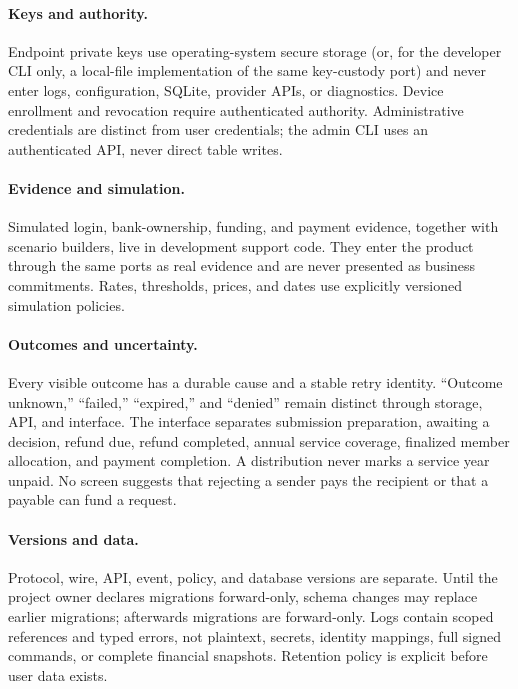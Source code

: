 \documentclass[11pt]{article}
\begin{document}
\paragraph{Keys and authority.} Endpoint private keys use operating-system secure
storage (or, for the developer CLI only, a local-file implementation of the same
key-custody port) and never enter logs, configuration, SQLite, provider APIs, or
diagnostics. Device enrollment and revocation require authenticated authority.
Administrative credentials are distinct from user credentials; the admin CLI uses
an authenticated API, never direct table writes.

\paragraph{Evidence and simulation.} Simulated login, bank-ownership, funding, and
payment evidence, together with scenario builders, live in development support
code. They enter the product through the same ports as real evidence and are never
presented as business commitments. Rates, thresholds, prices, and dates use
explicitly versioned simulation policies.

\paragraph{Outcomes and uncertainty.} Every visible outcome has a durable cause
and a stable retry identity. ``Outcome unknown,'' ``failed,'' ``expired,'' and
``denied'' remain distinct through storage, API, and interface. The interface
separates submission preparation, awaiting a decision, refund due, refund
completed, annual service coverage, finalized member allocation, and payment
completion. A distribution never marks a service year unpaid. No screen suggests
that rejecting a sender pays the recipient or that a payable can fund a request.

\paragraph{Versions and data.} Protocol, wire, API, event, policy, and database
versions are separate. Until the project owner declares migrations
forward-only, schema changes may replace earlier migrations; afterwards
migrations are forward-only. Logs contain scoped references and typed errors, not
plaintext, secrets, identity mappings, full signed commands, or complete financial
snapshots. Retention policy is explicit before user data exists.
\end{document}
